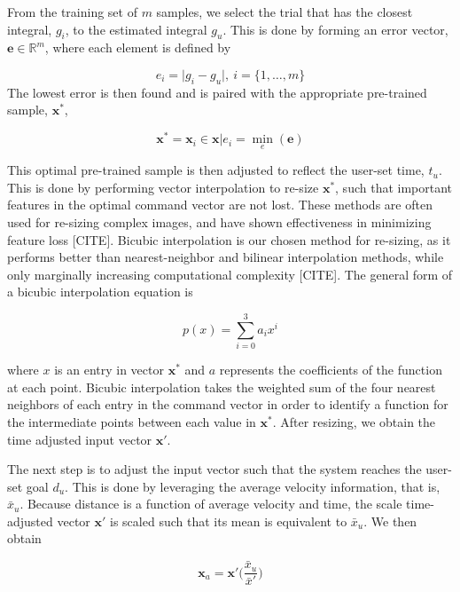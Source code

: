 \documentclass[letterpaper, 10 pt, conference]{ieeeconf}  %
\newcommand{\R}{\mathbb{R}}
\begin{document}
From the training set of $m$ samples, we select the trial that has the closest integral, $g_i$, to the estimated integral $g_u$. This is done by forming an error vector, $\mathbf{e}\in\R^{m}$, where each element is defined by

\begin{equation}
 e_i = \vert g_i-g_u \vert , ~i= \{1,\ldots,m\}
\end{equation}
 The lowest error is then found and is paired with the appropriate pre-trained sample, $\mathbf{x}^*$,

\begin{equation}
\mathbf{x}^* = \mathbf{x}_i \in \mathbf{x}\vert e_i = \min_e(\mathbf{e})
\end{equation}

This optimal pre-trained sample is then adjusted to reflect the user-set time, $t_u$. This is done by performing vector interpolation to re-size $\mathbf{x}^*$, such that important features in the optimal command vector are not lost. These methods are often used for re-sizing complex images, and have shown effectiveness in minimizing feature loss [CITE]. Bicubic interpolation is our chosen method for re-sizing, as it performs better than nearest-neighbor and bilinear interpolation methods, while only marginally increasing computational complexity [CITE]. The general form of a bicubic interpolation equation is 

\begin{equation} \label{eq:bicinter}
    p(x) = \sum_{i=0}^3a_ix^i
\end{equation}

where $x$ is an entry in vector $\mathbf{x}^*$ and $a$ represents the coefficients of the function at each point. Bicubic interpolation takes the weighted sum of the four nearest neighbors of each entry in the command vector in order to identify a function for the intermediate points between each value in $\mathbf{x}^*$. After resizing, we obtain the time adjusted input vector $\mathbf{x}'$.

The next step is to adjust the input vector such that the system reaches the user-set goal $d_u$. This is done by leveraging the average velocity information, that is, $\bar{x}_u$. Because distance is a function of average velocity and time, the scale time-adjusted vector $\mathbf{x}'$ is scaled such that its mean is equivalent to $\bar{x}_u$. We then obtain

\begin{equation} \label{eq:imgscale}
\mathbf{x}_a = \mathbf{x}'\bigg(\frac{\bar{x}_u}{\bar{x}'}\bigg)
\end{equation}
\end{document}

